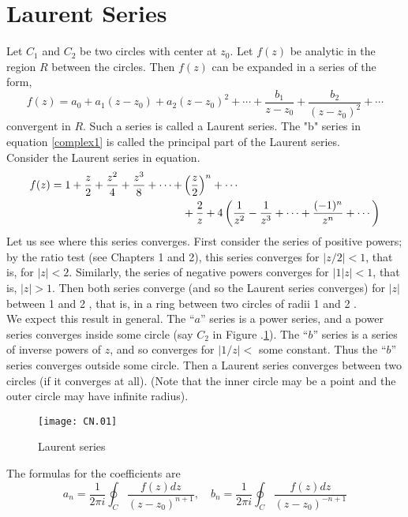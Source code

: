\section{Laurent Series}
Let $C_{1}$ and $C_{2}$ be two circles with center at $z_{0}$. Let $f(z)$ be analytic in the region $R$ between the circles. Then $f(z)$ can be expanded in a series of the form,
\begin{equation}
f(z)=a_{0}+a_{1}\left(z-z_{0}\right)+a_{2}\left(z-z_{0}\right)^{2}+\cdots+\frac{b_{1}}{z-z_{0}}+\frac{b_{2}}{\left(z-z_{0}\right)^{2}}+\cdots \label{complex1}
\end{equation}
convergent in $R$. Such a series is called a Laurent series. The "b" series in equation \ref{complex1} is called the principal part of the Laurent series.\\
 Consider the Laurent series in equation.\label{complex1}
\begin{align}
f(z)=1+\frac{z}{2}+\frac{z^{2}}{4}+\frac{z^{3}}{8}+\cdots+&\left(\frac{z}{2}\right)^{n}+\cdots \notag\\
&+\frac{2}{z}+4\left(\frac{1}{z^{2}}-\frac{1}{z^{3}}+\cdots+\frac{(-1)^{n}}{z^{n}}+\cdots\right)\label{complex2}
\end{align}
Let us see where this series converges. First consider the series of positive powers; by the ratio test (see Chapters 1 and 2), this series converges for $|z / 2|<1$, that is, for $|z|<2$. Similarly, the series of negative powers converges for $|1| z \mid<1$, that is, $|z|>1$. Then both series converge (and so the Laurent series converges) for $|z|$ between 1 and 2 , that is, in a ring between two circles of radii 1 and 2 .\\
We expect this result in general. The ``$a$'' series is a power series, and a power series converges inside some circle (say $C_{2}$ in Figure .\ref{Laurent series}). The  ``$b$'' series is a series of inverse powers of $z$, and so converges for $|1 / z|<$ some constant. Thus the ``$b$'' series converges outside some circle. Then a Laurent series converges between two circles (if it converges at all). (Note that the inner circle may be a point and the outer circle may have infinite radius).
\begin{figure}[H]
	\centering
	\texttt{[image: CN.01]}
	\caption{Laurent series}
	\label{Laurent series}
\end{figure}
The formulas for the coefficients are 
$$
a_{n}=\frac{1}{2 \pi i} \oint_{C} \frac{f(z) d z}{\left(z-z_{0}\right)^{n+1}}, \quad b_{n}=\frac{1}{2 \pi i} \oint_{C} \frac{f(z) d z}{\left(z-z_{0}\right)^{-n+1}}
$$
